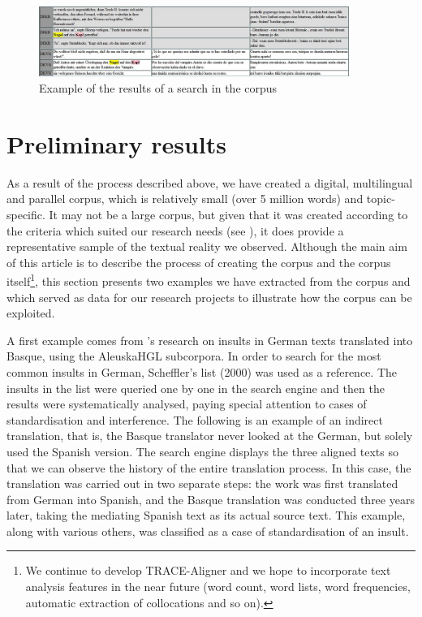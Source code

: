 \documentclass[output=paper]{LSP/langsci}
\begin{document}
\begin{figure}
\includegraphics[width=0.9\textwidth]{./figures/6-7.jpg} 
\caption{Example of the results of a search in the corpus} \label{fig:3:7}
\end{figure}

\section{Preliminary results}
As a result of the process described above, we have created a digital, multilingual and parallel corpus, which is relatively small (over 5 million words) and topic-specific. It may not be a large corpus, but given that it was created according to the criteria which suited our research needs (see ), it does provide a representative sample of the textual reality we observed. Although the main aim of this article is to describe the process of creating the corpus and the corpus itself\footnote{We continue to develop TRACE-Aligner and we hope to incorporate text analysis features in the near future (word count, word lists, word frequencies, automatic extraction of collocations and so on).}, this section presents two examples we have extracted from the corpus and which served as data for our research projects to illustrate how the corpus can be exploited.

A first example comes from \citeauthor{Zubillaga2013}'s \citeyear{Zubillaga2013} research on insults in German texts translated into Basque, using the AleuskaHGL subcorpora. In order to search for the most common insults in German, Scheffler's list (2000) was used as a reference. The insults in the list were queried one by one in the search engine and then the results were systematically analysed, paying special attention to cases of standardisation and interference. The following is an example of an indirect translation, that is, the Basque translator never looked at the German, but solely used the Spanish version. The search engine displays the three aligned texts so that we can observe the history of the entire translation process. In this case, the translation was carried out in two separate steps: the work was first translated from German into Spanish, and the Basque translation was conducted three years later, taking the mediating Spanish text as its actual source text. This example, along with various others, was classified as a case of standardisation of an insult.
\end{document}
